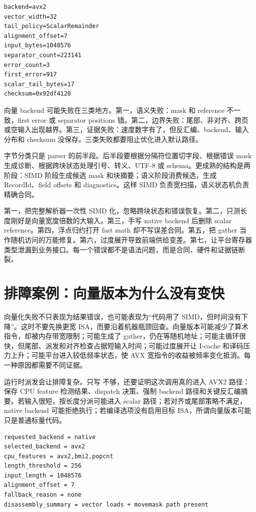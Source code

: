 \begin{lstlisting}[numbers=none,caption={ASCII 分类证据摘要}]
backend=avx2
vector_width=32
tail_policy=ScalarRemainder
alignment_offset=7
input_bytes=1048576
separator_count=223141
error_count=3
first_error=917
scalar_tail_bytes=17
checksum=0x92df4120
\end{lstlisting}

向量 backend 可能失败在三类地方。第一，语义失败：mask 和 reference 不一致，first error 或 separator positions 错。第二，边界失败：尾部、非对齐、跨页或空输入出现越界。第三，证据失败：速度数字有了，但反汇编、backend、输入分布和 checksum 没保存。三类失败都要阻止优化进入默认路径。

字节分类只是 parser 的前半段。后半段要根据分隔符位置切字段、根据错误 mask 生成诊断、根据跨块状态处理引号、转义、UTF-8 或 schema。更成熟的结构是两阶段：SIMD 阶段生成候选 mask 和块摘要；语义阶段消费候选，生成 RecordId、field offsets 和 diagnostics。这样 SIMD 负责宽扫描，语义状态机负责精确合同。

第一，把完整解析器一次性 SIMD 化，忽略跨块状态和错误恢复。第二，只测长度刚好是向量宽度倍数的大输入。第三，手写 native backend 后删除 scalar reference。第四，浮点归约打开 fast math 却不写误差合同。第五，把 gather 当作随机访问的万能修复。第六，过度展开导致前端供给变差。第七，让平台寄存器类型泄漏到业务接口。每一个错误都不是语法问题，而是合同、硬件和证据链断裂。

\section{排障案例：向量版本为什么没有变快}

向量化失败不只表现为结果错误，也可能表现为“代码用了 SIMD，但时间没有下降”。这时不要先换更宽 ISA，而要沿着机器瓶颈回查。向量版本可能减少了算术指令，却被内存带宽限制；可能生成了 gather，仍在等随机地址；可能主循环很快，但尾部、派发和对齐检查占据短输入时间；可能过度展开让 I-cache 和译码压力上升；可能平台进入较低频率状态，使 AVX 宽指令的收益被频率变化抵消。每一种原因都需要不同证据。

运行时派发会让排障复杂。只写  不够，还要证明这次调用真的进入 AVX2 路径：保存 CPU feature 检测结果、dispatch 决策、强制 backend 路径和关键反汇编摘要。若输入很短，按长度分派可能进入 scalar 路径；若对齐或尾部策略不满足，native backend 可能拒绝执行；若编译选项没有启用目标 ISA，所谓向量版本可能只是普通标量代码。

\begin{lstlisting}[numbers=none,caption={backend 排障字段}]
requested_backend = native
selected_backend = avx2
cpu_features = avx2,bmi2,popcnt
length_threshold = 256
input_length = 1048576
alignment_offset = 7
fallback_reason = none
disassembly_summary = vector loads + movemask path present
\end{lstlisting}

